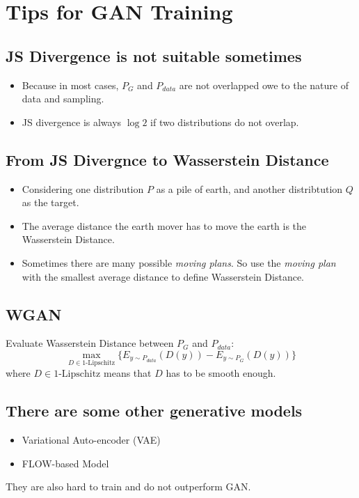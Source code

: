 \documentclass[11pt]{book}
\begin{document}
\section{Tips for GAN Training}
\subsection*{JS Divergence is not suitable sometimes}
\begin{itemize}
    \item Because in most cases, $P_G$ and $P_{data}$ are not overlapped owe to the nature of data and sampling.
    \item JS divergence is always $\log 2$ if two distributions do not overlap.
\end{itemize}
\subsection*{From JS Divergnce to Wasserstein Distance}
\begin{itemize}
    \item Considering one distribution $P$ as a pile of earth, and another distribtution $Q$ as the target.
    \item The average distance the earth mover has to move the earth is the Wasserstein Distance.
    \item Sometimes there are many possible \textit{moving plans}. So use the \textit{moving plan} with the smallest average distance to define Wasserstein Distance.
\end{itemize}
\subsection*{WGAN}
Evaluate Wasserstein Distance between $P_G$ and $P_{data}$:
\begin{displaymath}
    \max_{D\in \text{1-Lipschitz}}\{E_{y\sim P_{data}}\left(D(y)\right)-E_{y\sim P_G}\left(D(y)\right)\}
\end{displaymath}
where $D\in \text{1-Lipschitz}$ means that $D$ has to be smooth enough.
\subsection*{There are some other generative models}
\begin{itemize}
    \item Variational Auto-encoder (VAE)
    \item FLOW-based Model
\end{itemize}
They are also hard to train and do not outperform GAN.
\end{document}
